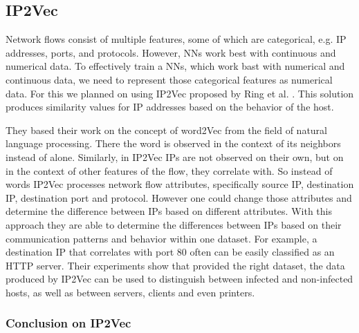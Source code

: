 \documentclass[
	ngerman,
	ruledheaders=section,%
	class=report,%
	thesis={type=bachelor},%
	accentcolor=9c,%
	custommargins=true,%
	marginpar=false,%
	parskip=half-,%
	fontsize=11pt,%
]{tudapub}
\begin{document}
\subsection{IP2Vec}
\label{sec:IP2Vec}

Network flows consist of multiple features, some of which are categorical, e.g. IP addresses, ports, and protocols.
However, NNs work best with continuous and numerical data.
To effectively train a NNs, which work bast with numerical and continuous data, we need to represent those categorical features as numerical data.
For this we planned on using IP2Vec proposed by Ring et al. \cite{ringIP2VecLearningSimilarities2017}.
This solution produces similarity values for IP addresses based on the behavior of the host.

They based their work on the concept of word2Vec from the field of natural language processing.
There the word is observed in the context of its neighbors instead of alone.
Similarly, in IP2Vec IPs are not observed on their own, but on in the context of other features of the flow, they correlate with.
So instead of words IP2Vec processes network flow attributes,
specifically source IP, destination IP, destination port and protocol.
However one could change those attributes and determine the difference between IPs based on different attributes.
With this approach they are able to determine the differences between IPs based on their communication patterns and behavior within one dataset.
For example, a destination IP that correlates with port 80 often can be easily classified as an HTTP server.
Their experiments show that provided the right dataset, the data produced by IP2Vec can be used to distinguish between infected and non-infected hosts, as well as between servers, clients and even printers.

\subsubsection{Conclusion on IP2Vec}
\label{sec:conclusionIP2Vec}



\end{document}
